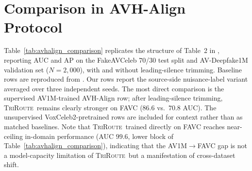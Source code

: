\documentclass{article}
\newcommand{\method}{\textsc{TriRoute}}
\begin{document}
\section{Comparison in AVH-Align Protocol}
\label{app:avhalign_protocol}

Table~\ref{tab:avhalign_comparison} replicates the structure of Table~2 in \citet{smeu2025avhalign}, reporting AUC and AP on the FakeAVCeleb 70/30 test split and AV-Deepfake1M validation set ($N=2{,}000$), with and without leading-silence trimming. Baseline rows are reproduced from \citet{smeu2025avhalign}. Our rows report the source-side nuisance-label variant averaged over three independent seeds. The most direct comparison is the supervised AV1M-trained AVH-Align row; after leading-silence trimming, \method\ remains clearly stronger on FAVC ($86.6$ vs.\ $70.8$ AUC). The unsupervised VoxCeleb2-pretrained rows are included for context rather than as matched baselines.
Note that \method\ trained directly on FAVC reaches near-ceiling in-domain performance (AUC $99.6$, lower block of Table~\ref{tab:avhalign_comparison}), indicating that the AV1M$\rightarrow$FAVC gap is not a model-capacity limitation of \method\ but a manifestation of cross-dataset shift.
\end{document}
